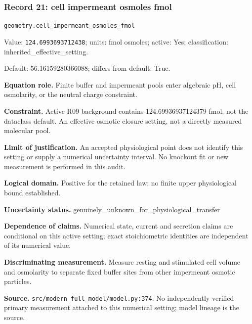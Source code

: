 \subsubsection*{Record 21: cell impermeant osmoles fmol}
{\small \nolinkurl{geometry.cell_impermeant_osmoles_fmol}\par

Value: \texttt{124.6993693712438}; units: fmol osmoles; active: Yes; classification: inherited\_effective\_setting.\par

Default: 56.16159280366088; differs from default: True.\par

\textbf{Equation role.} Finite buffer and impermeant pools enter algebraic pH, cell osmolarity, or the neutral charge constraint.\par

\textbf{Constraint.} Active R09 background contains 124.69936937124379 fmol, not the dataclass default. An effective osmotic closure setting, not a directly measured molecular pool.\par

\textbf{Limit of justification.} An accepted physiological point does not identify this setting or supply a numerical uncertainty interval. No knockout fit or new measurement is performed in this audit.\par

\textbf{Logical domain.} Positive for the retained law; no finite upper physiological bound established.\par

\textbf{Uncertainty status.} genuinely\_unknown\_for\_physiological\_transfer\par

\textbf{Dependence of claims.} Numerical state, current and secretion claims are conditional on this active setting; exact stoichiometric identities are independent of its numerical value.\par

\textbf{Discriminating measurement.} Measure resting and stimulated cell volume and osmolarity to separate fixed buffer sites from other impermeant osmotic particles.\par

\textbf{Source.} \nolinkurl{src/modern_full_model/model.py:374}. No independently verified primary measurement attached to this numerical setting; model lineage is the source.\par}

